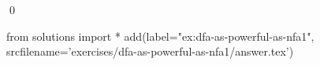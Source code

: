 
\begin{ex} 
  \label{ex:dfa-as-powerful-as-nfa1}
  
  \qed
\end{ex} 
\begin{python0}
from solutions import *
add(label="ex:dfa-as-powerful-as-nfa1",
    srcfilename='exercises/dfa-as-powerful-as-nfa1/answer.tex') 
\end{python0}
